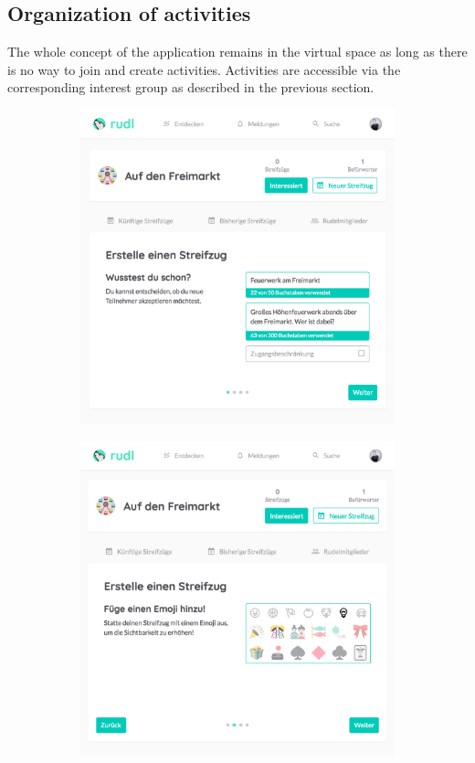\documentclass[12pt,numbers=noenddot,parskip,bibliography=totocnumbered,listof=totocnumbered,draft]{scrreprt}
\begin{document}
\subsection{Organization of activities}
The whole concept of the application remains in the virtual space as long as there is no way to join and create activities. Activities are accessible via the corresponding interest group as described in the previous section.

\begin{figure}
\begin{subfigure}[t]{0.45\textwidth}%
\centering
\includegraphics[width=\linewidth]{createactivity0.png}
\caption{}
\label{createactivity0}
\end{subfigure}%
\hfill
\begin{subfigure}[t]{0.45\textwidth}%
\centering
\includegraphics[width=\linewidth]{createactivity1.png}

\end{subfigure}
\end{figure}
\end{document}
